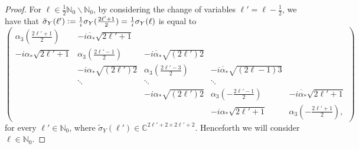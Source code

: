 \documentclass[11pt]{amsart}
\numberwithin{theorem}{section}
\numberwithin{equation}{section}
\theoremstyle{definition}
\numberwithin{example}{section}
\theoremstyle{definition}
\theoremstyle{definition}
\newcommand{\N}{\mathbb{N}}
\newcommand{\C}{\mathbb{C}}
\begin{document}
\begin{proof}
For $\ell\in\frac{1}{2}\N_0\backslash\N_0$, by considering the change of variables $\ell'=\ell-\frac{1}{2}$, we have that $ \tilde \sigma_Y(\ell')\vcentcolon=\frac{1}{i}\sigma_Y(\frac{2\ell'+1}{2})=\frac{1}{i}\sigma_Y(\ell)$ is equal to
\begin{equation*}
   \begin{pmatrix}
        \alpha_3(\frac{2\ell'+1}{2}) & -\overline{i\alpha_*}\sqrt{2\ell'+1}&&&\\
        -i\alpha_*\sqrt{2\ell'+1} &\alpha_3(\frac{2\ell'-1}{2})&-\overline{i\alpha_*}\sqrt{(2\ell')2}&&\\
        &-i\alpha_*\sqrt{(2\ell')2}&\alpha_3(\frac{2\ell'-3}{2})&-\overline{i\alpha_*}\sqrt{(2\ell-1)3}& \\
        &\ddots&\ddots&\ddots&\\
        &&-i\alpha_*\sqrt{(2\ell')2}&\alpha_3(-\frac{2\ell'-1}{2})&-\overline{i\alpha_*}\sqrt{2\ell'+1}\\
        & &&-i\alpha_*\sqrt{2\ell'+1}&\alpha_3(-\frac{2\ell'+1}{2}),
    \end{pmatrix}
\end{equation*}
for every $\ell'\in\N_0$, where $\tilde \sigma_Y(\ell')\in \C^{2\ell'+2\times 2\ell'+2}$. Henceforth we will consider $\ell\in\N_0$.


\end{proof}
\end{document}

